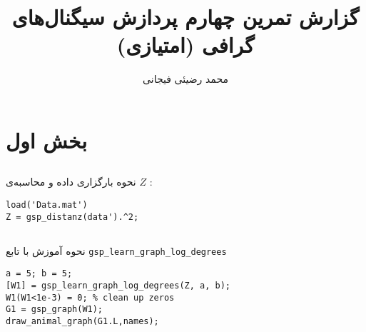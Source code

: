 \title{گزارش تمرین چهارم پردازش سیگنال‌های گرافی (امتیازی)}
\author{محمد رضیئی فیجانی}


\makeatletter
{}
\makeatother



\maketitle


\section{بخش اول}

\subsection{}

نحوه بارگزاری داده و  محاسبه‌ی $Z$ :

\begin{latin}
\begin{lstlisting}
load('Data.mat')
Z = gsp_distanz(data').^2;
\end{lstlisting}
\end{latin}

\subsection{}

نحوه آموزش با تابع
\verb|gsp_learn_graph_log_degrees|

\begin{latin}
\begin{lstlisting}
a = 5; b = 5;
[W1] = gsp_learn_graph_log_degrees(Z, a, b);
W1(W1<1e-3) = 0; % clean up zeros
G1 = gsp_graph(W1);
draw_animal_graph(G1.L,names);
\end{lstlisting}
\end{latin}


